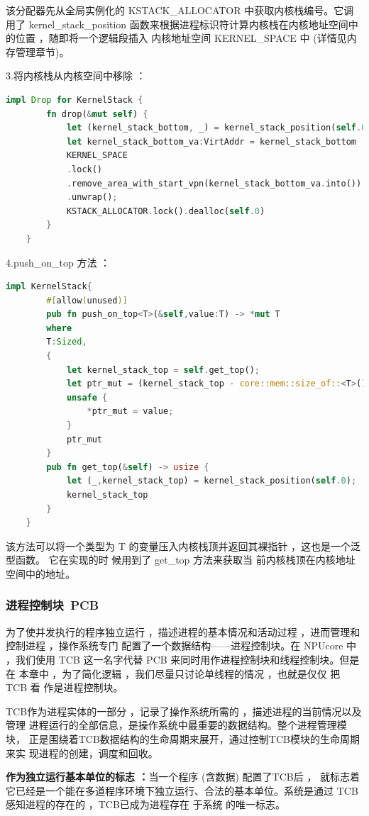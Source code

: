 该分配器先从全局实例化的 KSTACK\_ALLOCATOR 中获取内核栈编号。它调用了  kernel\_stack\_position
函数来根据进程标识符计算内核栈在内核地址空间中的位置 ，随即将一个逻辑段插入
内核地址空间 KERNEL\_SPACE 中  (详情见内存管理章节)。

3.将内核栈从内核空间中移除 ：
\begin{lstlisting}[language=Rust]
	impl Drop for KernelStack {
		fn drop(&mut self) {
			let (kernel_stack_bottom, _) = kernel_stack_position(self.0);
			let kernel_stack_bottom_va:VirtAddr = kernel_stack_bottom .into();
			KERNEL_SPACE
			.lock()
			.remove_area_with_start_vpn(kernel_stack_bottom_va.into())
			.unwrap();
			KSTACK_ALLOCATOR.lock().dealloc(self.0)
		}
	}
\end{lstlisting}

4.push\_on\_top 方法 ：
\begin{lstlisting}[language=Rust]
	impl KernelStack{
		#[allow(unused)]
		pub fn push_on_top<T>(&self,value:T) -> *mut T
		where
		T:Sized,
		{
			let kernel_stack_top = self.get_top();
			let ptr_mut = (kernel_stack_top - core::mem::size_of::<T>()) as *mut T;
			unsafe {
				*ptr_mut = value;
			}
			ptr_mut
		}
		pub fn get_top(&self) -> usize {
			let (_,kernel_stack_top) = kernel_stack_position(self.0);
			kernel_stack_top
		}
	}
\end{lstlisting}

该方法可以将一个类型为  T 的变量压入内核栈顶并返回其裸指针 ，这也是一个泛型函数。  它在实现的时 候用到了  get\_top 方法来获取当
前内核栈顶在内核地址空间中的地址。

\subsubsection{进程控制块\ PCB}
为了使并发执行的程序独立运行 ，描述进程的基本情况和活动过程 ，进而管理和
控制进程 ，操作系统专门 配置了一个数据结构——进程控制块。在 NPUcore 中 ，我们使用 TCB 这一名字代替 PCB 来同时用作进程控制块和线程控制块。但是在
本章中 ，为了简化逻辑 ，我们尽量只讨论单线程的情况 ，也就是仅仅 把 TCB 看
作是进程控制块。

TCB作为进程实体的一部分 ，记录了操作系统所需的 ，描述进程的当前情况以及管理
进程运行的全部信息，是操作系统中最重要的数据结构。整个进程管理模块，
正是围绕着TCB数据结构的生命周期来展开，通过控制TCB模块的生命周期来实
现进程的创建，调度和回收。

\textbf{作为独立运行基本单位的标志 ：}当一个程序  (含数据)  配置了TCB后 ，
就标志着它已经是一个能在多道程序环境下独立运行、合法的基本单位。系统是通过
TCB感知进程的存在的 ，TCB已成为进程存在 于系统 的唯一标志。

